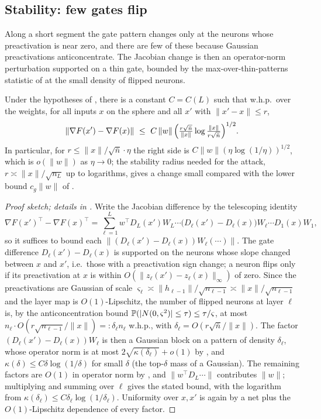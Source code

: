 \subsection{Stability: few gates flip}
Along a short segment the gate pattern changes only at the neurons whose preactivation is near zero,
and there are few of these because Gaussian preactivations anticoncentrate. The Jacobian change is
then an operator-norm perturbation supported on a thin gate, bounded by the max-over-thin-patterns
statistic of  at the small density of flipped neurons.

\begin{theorem}\label{thm:stability}
Under the hypotheses of , there is a constant $C=C(L)$ such that w.h.p.\ over the
weights, for all inputs $x$ on the sphere and all $x'$ with $\|x'-x\|\le r$,
\[
  \|\nabla F(x')-\nabla F(x)\|\ \le\ C\,\|w\|\,\Bigl(\tfrac{r\sqrt{\bar n}}{\|x\|}\log\tfrac{\|x\|}{r\sqrt{\bar n}}\Bigr)^{1/2}.
\]
In particular, for $r\le \|x\|/\sqrt{\bar n}\cdot\eta$ the right side is $C\|w\|(\eta\log(1/\eta))^{1/2}$,
which is $o(\|w\|)$ as $\eta\to0$; the stability radius needed for the attack, $r\asymp\|x\|/\sqrt{n_L}$
up to logarithms, gives a change small compared with the lower bound $c_g\|w\|$ of .
\end{theorem}

\begin{proof}[Proof sketch; details in ]
Write the Jacobian difference by the telescoping identity
\[
  \nabla F(x')^\top-\nabla F(x)^\top=\sum_{\ell=1}^L
  w^\top D_L(x')W_L\cdots\bigl(D_\ell(x')-D_\ell(x)\bigr)W_\ell\cdots D_1(x)W_1,
\]
so it suffices to bound each $\|(D_\ell(x')-D_\ell(x))W_\ell(\cdots)\|$. The gate difference
$D_\ell(x')-D_\ell(x)$ is supported on the neurons whose slope changed between $x$ and $x'$, i.e.\ those
with a preactivation sign change; a neuron flips only if its preactivation at $x$ is within
$O(\|z_\ell(x')-z_\ell(x)\|_\infty)$ of zero. Since the preactivations are Gaussian of scale
$\varsigma_\ell\asymp\|h_{\ell-1}\|/\sqrt{n_{\ell-1}}\asymp\|x\|/\sqrt{n_{\ell-1}}$ and the layer map is
$O(1)$-Lipschitz, the number of flipped neurons at layer $\ell$ is, by the anticoncentration bound
$\mathbb{P}(|N(0,\varsigma^2)|\le\tau)\le\tau/\varsigma$, at most $n_\ell\cdot O(r\sqrt{n_{\ell-1}}/\|x\|)=:%
\delta_\ell n_\ell$ w.h.p., with $\delta_\ell=O(r\sqrt{\bar n}/\|x\|)$. The factor
$(D_\ell(x')-D_\ell(x))W_\ell$ is then a Gaussian block on a pattern of density $\delta_\ell$, whose
operator norm is at most $2\sqrt{\kappa(\delta_\ell)}+o(1)$ by , and
$\kappa(\delta)\le C\delta\log(1/\delta)$ for small $\delta$ (the top-$\delta$ mass of a Gaussian).
The remaining factors are $O(1)$ in operator norm by , and $\|w^\top D_L\cdots\|$
contributes $\|w\|$; multiplying and summing over $\ell$ gives the stated bound, with the logarithm
from $\kappa(\delta_\ell)\le C\delta_\ell\log(1/\delta_\ell)$. Uniformity over $x,x'$ is again by a net
plus the $O(1)$-Lipschitz dependence of every factor.
\end{proof}

